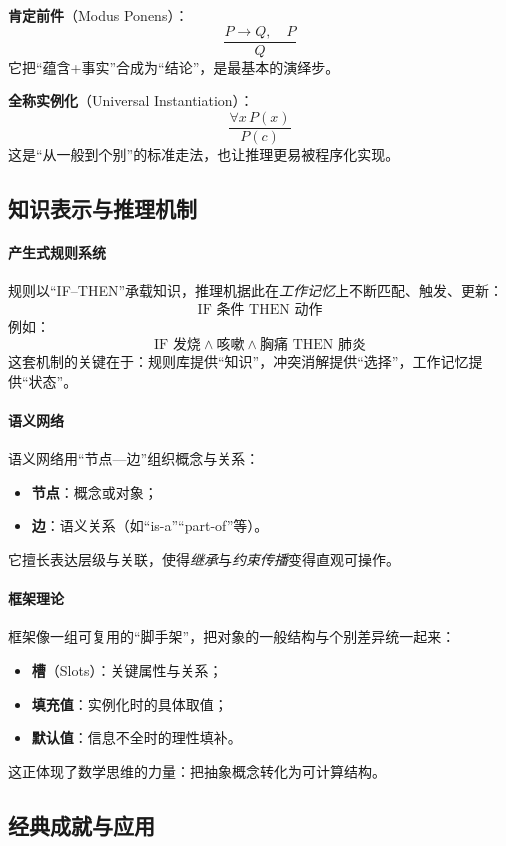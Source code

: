 \textbf{肯定前件}（Modus Ponens）：
$$\frac{P \rightarrow Q, \quad P}{Q}$$
它把“蕴含+事实”合成为“结论”，是最基本的演绎步。

\textbf{全称实例化}（Universal Instantiation）：
$$\frac{\forall x \, P(x)}{P(c)}$$
这是“从一般到个别”的标准走法，也让推理更易被程序化实现。

\subsection{知识表示与推理机制}

\paragraph{产生式规则系统}
规则以“IF–THEN”承载知识，推理机据此在\emph{工作记忆}上不断匹配、触发、更新：  
$$\text{IF } \text{条件} \text{ THEN } \text{动作}$$
例如：
$$\text{IF } \text{发烧} \land \text{咳嗽} \land \text{胸痛} \text{ THEN } \text{肺炎}$$
这套机制的关键在于：规则库提供“知识”，冲突消解提供“选择”，工作记忆提供“状态”。

\paragraph{语义网络}
语义网络用“节点—边”组织概念与关系：
\begin{itemize}
\item \textbf{节点}：概念或对象；
\item \textbf{边}：语义关系（如“is-a”“part-of”等）。
\end{itemize}
它擅长表达层级与关联，使得\emph{继承}与\emph{约束传播}变得直观可操作。

\paragraph{框架理论}
框架像一组可复用的“脚手架”，把对象的一般结构与个别差异统一起来：
\begin{itemize}
\item \textbf{槽}（Slots）：关键属性与关系；
\item \textbf{填充值}：实例化时的具体取值；
\item \textbf{默认值}：信息不全时的理性填补。
\end{itemize}
这正体现了数学思维的力量：把抽象概念转化为可计算结构。

\subsection{经典成就与应用}

